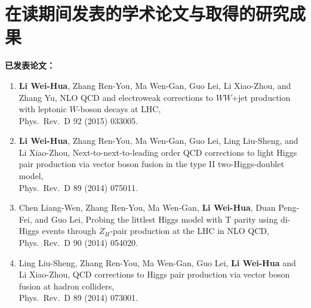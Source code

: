 ﻿
\chapter{在读期间发表的学术论文与取得的研究成果}

\noindent\textbf{已发表论文：}

\begin{enumerate}

\item {\bf Li Wei-Hua}, Zhang Ren-You, Ma Wen-Gan, Guo Lei, Li Xiao-Zhou, and Zhang Yu,
NLO QCD and electroweak corrections to $WW$+jet production with leptonic $W$-boson decays at LHC,
\\ Phys.~Rev.~D 92 (2015) 033005. 
\item {\bf Li Wei-Hua}, Zhang Ren-You, Ma Wen-Gan, Guo Lei, Ling Liu-Sheng, and Li Xiao-Zhou,
Next-to-next-to-leading order QCD corrections to light Higgs pair production
via vector boson fusion in the type II two-Higgs-doublet model, 
\\ Phys.~Rev.~D 89 (2014) 075011. 
\item Chen Liang-Wen, Zhang Ren-You, Ma Wen-Gan, {\bf Li Wei-Hua}, Duan Peng-Fei, and Guo Lei,
Probing the littlest Higgs model with T parity using di-Higgs events through
$Z_H$-pair production at the LHC in NLO QCD,
\\ Phys.~Rev.~D 90 (2014) 054020. 
\item Ling Liu-Sheng, Zhang Ren-You, Ma Wen-Gan, Guo Lei, {\bf Li Wei-Hua} and Li Xiao-Zhou,
QCD corrections to Higgs pair production via vector boson fusion
at hadron colliders, 
\\ Phys.~Rev.~D 89 (2014) 073001. 
\end{enumerate}
